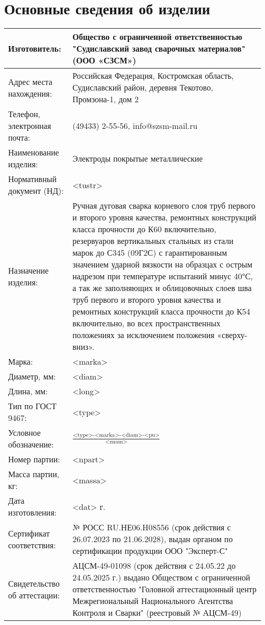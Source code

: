 \documentclass[russian,utf8,pointsection,nocolumnxxxi,nocolumnxxxii,12pt]{eskdtext}
\begin{document}
\maketitle

\tableofcontents
\pagebreak[4]

\section{ Основные сведения об изделии }

\begin{tabular}{|p{5cm}|p{10cm}|}
\hline 
Изготовитель: & Общество с ограниченной ответственностью "Судиславский завод сварочных материалов" (ООО «СЗСМ»)  \\
\hline 
Адрес места нахождения: & Российская Федерация, Костромская область, Судиславский район, деревня Текотово, Промзона-1, дом 2  \\
\hline 
Телефон, электронная почта: & (49433) 2-55-56, info@szsm-mail.ru \\
\hline 
Наименование изделия: & Электроды покрытые металлические \\
\hline 
Нормативный документ (НД): & <tustr> \\
\hline 
Назначение изделия:  & Ручная дуговая сварка корневого слоя труб первого и второго уровня качества, ремонтных конструкций класса прочности до К60 включительно, резервуаров вертикальных стальных из стали марок до С345 (09Г2С) с гарантированным значением ударной вязкости на образцах с острым надрезом при температуре испытаний минус 40°С, а так же заполняющих и облицовочных слоев шва труб первого и второго уровня качества и ремонтных конструкций класса прочности до К54 включительно, во всех пространственных положениях за исключением положения «сверху-вниз». \\
\hline 
Марка: & <marka> \\
\hline 
Диаметр, мм: & <diam> \\
\hline 
Длина, мм: & <long> \\
\hline 
Тип по ГОСТ 9467: & <type> \\
\hline 
Условное обозначение: & \vspace{-2.5mm}  $ \frac {\text{<type>-<marka>-<diam>-<pu>}}{\text{<znam>}} $ \vspace{2.5mm}\\
\hline 
Номер партии: & <npart> \\
\hline 
Масса партии, кг: & <massa> \\
\hline 
Дата изготовления: & <dat> г. \\
\hline 
Сертификат соответствия: & № РОСС RU.НЕ06.H08556 (срок действия с 26.07.2023 по 21.06.2028), выдан органом по сертификации продукции ООО "Эксперт-С" \\
\hline 
Свидетельство об аттестации: & АЦСМ-49-01098 (срок действия с 24.05.22 до 24.05.2025 г.) выдано Обществом с ограниченной ответственностью "Головной аттестационный центр Межрегиональный Национального Агентства Контроля и Сварки" (реестровый № АЦСМ-49) \\
\hline 
\end{tabular}
\end{document}
